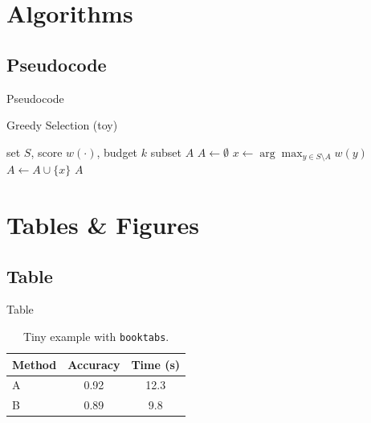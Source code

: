 \documentclass[aspectratio=169, xcolor=table]{beamer}
\begin{document}
\section{Algorithms}
\subsection{Pseudocode}
\begin{frame}{Pseudocode}
  \begin{algorithm}[H]
    \caption{Greedy Selection (toy)}
    \begin{algorithmic}[1]
      \Require set $S$, score $w(\cdot)$, budget $k$
      \Ensure  subset $A$
      \State $A \gets \emptyset$
        \State $x \gets \arg\max_{y\in S\setminus A} w(y)$
        \State $A \gets A \cup \{x\}$
      \EndWhile
      \State \Return $A$
    \end{algorithmic}
  \end{algorithm}
\end{frame}

\section{Tables \& Figures}
\subsection{Table}
\begin{frame}{Table}
  \begin{table}
    \centering
    \caption{Tiny example with \texttt{booktabs}.}
    \begin{tabular}{@{}lS[table-format=1.2]S[table-format=2.1]@{}}
      \toprule
      Method & {Accuracy} & {Time (s)} \\
      \midrule
      A & 0.92 & 12.3 \\
      B & 0.89 & 9.8 \\
      \bottomrule
    \end{tabular}
  \end{table}
\end{frame}
\end{document}
